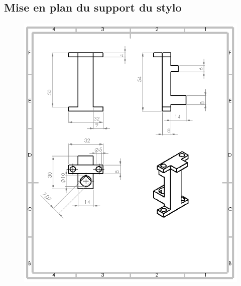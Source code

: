 \begin{changemargin}{-2cm}{-4cm}
\chapter*{Mise en plan du support du stylo}
\begin{figure}[!h]
\label{supportstylo}
 \center
 \includegraphics[scale=1]{../3Dmodels/supportstylo.png}
\end{figure}


\end{changemargin}
